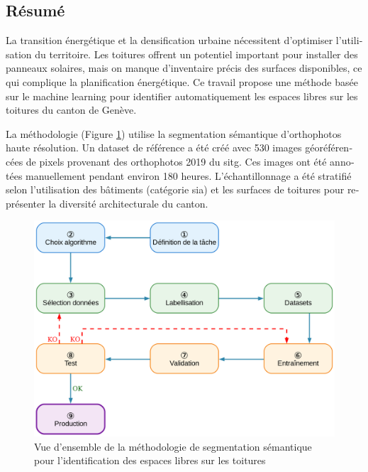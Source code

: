 \cleardoublepage
\begin{otherlanguage}{french}
\chapter*{Résumé}

La transition énergétique et la densification urbaine nécessitent d'optimiser l'utilisation du territoire. Les toitures offrent un potentiel important pour installer des panneaux solaires, mais on manque d'inventaire précis des surfaces disponibles, ce qui complique la planification énergétique. Ce travail propose une méthode basée sur le machine learning pour identifier automatiquement les espaces libres sur les toitures du canton de Genève.

La méthodologie (Figure \ref{fig:resume_ch3_resume_machine_learning_supervise}) utilise la segmentation sémantique d'orthophotos haute résolution. Un dataset de référence a été créé avec 530 images géoréférencées de \si{} pixels provenant des orthophotos 2019 du \acrshort{sitg}. Ces images ont été annotées manuellement pendant environ 180 heures. L'échantillonnage a été stratifié selon l'utilisation des bâtiments (catégorie \gls{sia}) et les surfaces de toitures pour représenter la diversité architecturale du canton.

\begin{figure}[htbp]
    \centering
    \includegraphics[width=1\linewidth]{03-tail/A1_fondamentaux_ML/A1_figures/A1_01_resume_machine_learning_supervise.png}
    \caption{Vue d'ensemble de la méthodologie de segmentation sémantique pour l'identification des espaces libres sur les toitures}
    \label{fig:resume_ch3_resume_machine_learning_supervise}
\end{figure}


\end{otherlanguage}
